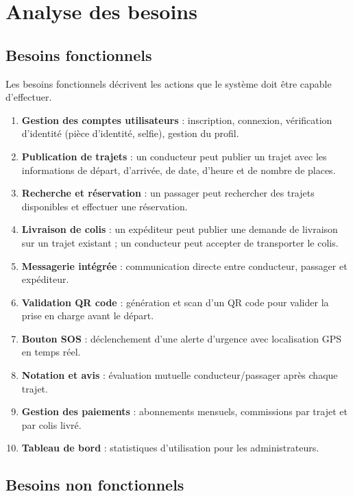 \documentclass[12pt, a4paper]{report}
\begin{document}
\section{Analyse des besoins}

\subsection{Besoins fonctionnels}

Les besoins fonctionnels décrivent les actions que le système doit être capable d'effectuer.

\begin{enumerate}
  \item \textbf{Gestion des comptes utilisateurs} : inscription, connexion, vérification
        d'identité (pièce d'identité, selfie), gestion du profil.
  \item \textbf{Publication de trajets} : un conducteur peut publier un trajet avec
        les informations de départ, d'arrivée, de date, d'heure et de nombre de places.
  \item \textbf{Recherche et réservation} : un passager peut rechercher des trajets
        disponibles et effectuer une réservation.
  \item \textbf{Livraison de colis} : un expéditeur peut publier une demande de livraison
        sur un trajet existant ; un conducteur peut accepter de transporter le colis.
  \item \textbf{Messagerie intégrée} : communication directe entre conducteur, passager
        et expéditeur.
  \item \textbf{Validation QR code} : génération et scan d'un \ac{QR} code pour valider
        la prise en charge avant le départ.
  \item \textbf{Bouton SOS} : déclenchement d'une alerte d'urgence avec localisation
        GPS en temps réel.
  \item \textbf{Notation et avis} : évaluation mutuelle conducteur/passager après chaque
        trajet.
  \item \textbf{Gestion des paiements} : abonnements mensuels, commissions par trajet
        et par colis livré.
  \item \textbf{Tableau de bord} : statistiques d'utilisation pour les administrateurs.
\end{enumerate}

\subsection{Besoins non fonctionnels}
\end{document}
